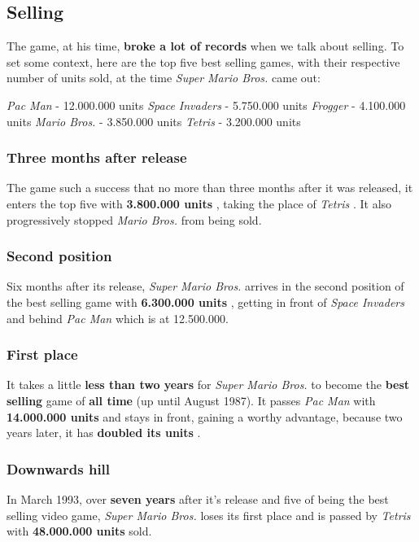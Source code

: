 \documentclass[a4paper,10pt]{book}
\begin{document}
 \subsection{Selling }
 The
          game, at his time,  \textbf{broke a lot of records }  when we talk about selling.
          To set some context, here are the top five best selling games, with
          their respective number of units sold, at the time  \textit{Super Mario
          Bros. } came out:
             
 \textit{Pac Man } - 12.000.000 units 
 \textit{Space Invaders } - 5.750.000 units 
 \textit{Frogger } - 4.100.000 units 
 \textit{Mario Bros. } - 3.850.000 units 
 \textit{Tetris } - 3.200.000 units 
 
 \subsubsection{Three months after release }
          The game such a success that no more than three months after it was
          released, it enters the top five with  \textbf{3.800.000 units } , taking the
          place of  \textit{Tetris }. It also progressively stopped  \textit{Mario
              Bros. } from being sold. 
 \subsubsection{Second position }
 Six
          months after its release,  \textit{Super Mario Bros. } arrives in the second
          position of the best selling game with  \textbf{6.300.000 units } , getting in
          front of  \textit{Space Invaders } and behind  \textit{Pac Man } which is at
          12.500.000. 
 \subsubsection{First place }
 It
          takes a little  \textbf{less than two years }  for  \textit{Super Mario Bros. }
          to become the  \textbf{best selling }  game of  \textbf{all time }  (up until
          August 1987). It passes  \textit{Pac Man } with  \textbf{14.000.000 units } 
          and stays in front, gaining a worthy advantage, because two years later,
          it has  \textbf{doubled its units } . 
 \subsubsection{Downwards hill }
 In
          March 1993, over  \textbf{seven years }  after it's release and five of
          being the best selling video game,  \textit{Super Mario Bros. } loses
          its first place and is passed by  \textit{Tetris } with  \textbf{48.000.000 units } 
          sold. 
\end{document}
